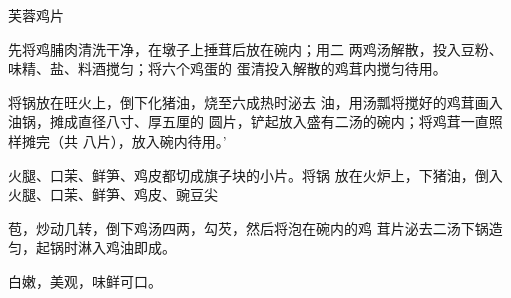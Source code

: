 \begin{recipe}{芙蓉鸡片}

\ingredients


\cooking

\step 	先将鸡脯肉清洗干净，在墩子上捶茸后放在碗内；用二 两鸡汤解散，投入豆粉、味精、盐、料酒搅匀；将六个鸡蛋的 蛋清投入解散的鸡茸内搅匀待用。

\step 	将锅放在旺火上，倒下化猪油，烧至六成热时泌去 油，用汤瓢将搅好的鸡茸画入油锅，摊成直径八寸、厚五厘的 圆片，铲起放入盛有二汤的碗内；将鸡茸一直照样摊完（共 八片），放入碗内待用。'

火腿、口茉、鲜笋、鸡皮都切成旗子块的小片。将锅 放在火炉上，下猪油，倒入火腿、口茉、鲜笋、鸡皮、豌豆尖

苞，炒动几转，倒下鸡汤四两，勾芡，然后将泡在碗内的鸡 茸片泌去二汤下锅造匀，起锅时淋入鸡油即成。

\notes

白嫩，美观，味鲜可口。

\end{recipe}

